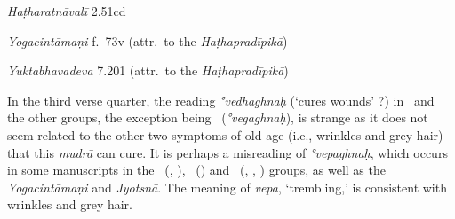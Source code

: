 \begin{ekdosis}

\begin{testimonia}[hp03_029]
\emph{Haṭharatnāvalī} 2.51cd
\begin{versinnote}
\end{versinnote}

\emph{Yogacintāmaṇi} f.~73v (attr.~to the \emph{Haṭhapradīpikā})
\begin{versinnote}
\end{versinnote}

\emph{Yuktabhavadeva} 7.201 (attr.~to the \emph{Haṭhapradīpikā})
\begin{versinnote}
\end{versinnote}

\end{testimonia}

\begin{philcomm}[hp03_029]
In the third verse quarter, the reading \emph{°vedhaghnaḥ} (`cures wounds' ?) in \textalpha\ and the other groups, the exception being \textgamma\ (\emph{°vegaghnaḥ}), is strange as it does not seem related to the other two symptoms of old age (i.e., wrinkles and grey hair) that this \emph{mudrā} can cure. It is perhaps a misreading of \emph{°vepaghnaḥ}, which occurs in some manuscripts in the \textbeta\ (, ), \textepsilon\ () and \textdelta\ (, , ) groups, as well as the \emph{Yogacintāmaṇi} and \emph{Jyotsnā}. The meaning of \emph{vepa}, `trembling,' is consistent with wrinkles and grey hair.

\end{philcomm}


\end{ekdosis}
